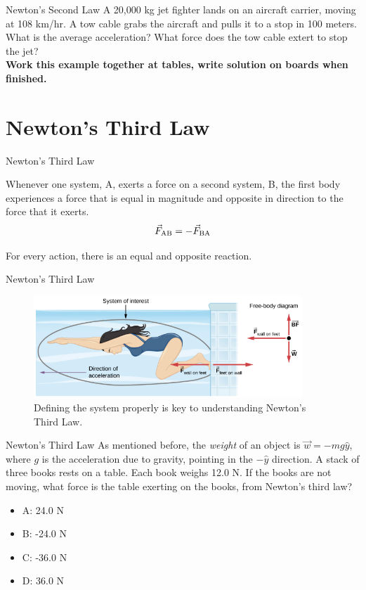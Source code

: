 \documentclass{beamer}
\begin{document}
\begin{frame}{Newton's Second Law}
A 20,000 kg jet fighter lands on an aircraft carrier, moving at 108 km/hr.  A tow cable grabs the aircraft and pulls it to a stop in 100 meters.  What is the average acceleration?  What force does the tow cable extert to stop the jet? \\ \vspace{1cm}
\textbf{Work this example together at tables, write solution on boards when finished.}
\end{frame}

\section{Newton's Third Law}

\begin{frame}{Newton's Third Law}
\begin{tcolorbox}[colback=white,colframe=red!40!blue,title=Newton's Third Law]
\alert{Whenever one system, A, exerts a force on a second system, B, the first body experiences a force that is equal in magnitude and opposite in direction to the force that it exerts.
\begin{equation}
\vec{F}_{\rm AB} = -\vec{F}_{\rm BA}
\end{equation}}
\end{tcolorbox}
For every action, there is an equal and opposite reaction.
\end{frame}

\begin{frame}{Newton's Third Law}
\begin{figure}
\centering
\includegraphics[width=0.9\textwidth]{figures/newtonsthird1.png}
\caption{\label{fig:newtons3} Defining the system properly is key to understanding Newton's Third Law.}
\end{figure}
\end{frame}

\begin{frame}{Newton's Third Law}
As mentioned before, the \textit{weight} of an object is $\vec{w} = -mg\hat{y}$, where $g$ is the acceleration due to gravity, pointing in the $-\hat{y}$ direction.  A stack of three books rests on a table.  Each book weighs 12.0 N.  If the books are not moving, what force is the table exerting on the books, from Newton's third law?
\begin{itemize}
\item A: 24.0 N
\item B: -24.0 N
\item C: -36.0 N
\item D: 36.0 N
\end{itemize}
\end{frame}
\end{document}
